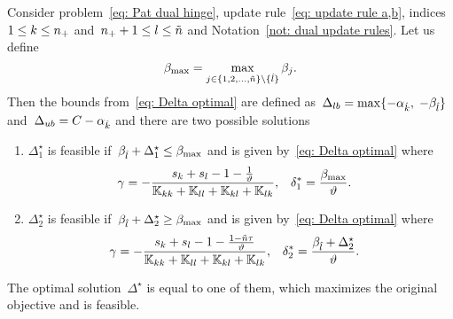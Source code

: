 \begin{lemma}\label{thm: patmat family hinge update a,b}
  Consider problem~\eqref{eq: Pat dual hinge}, update rule~\eqref{eq: update rule a,b}, indices~$1 \leq k \leq n_{+}$ and~$n_{+} + 1 \leq l \leq \tilde{n}$  and Notation~\ref{not: dual update rules}. Let us define
  \begin{equation*}
    \beta_{\max} = \max_{j \in \{1, 2, \ldots, \tilde{n} \} \setminus \{\hat{l}\}} \beta_j.
  \end{equation*}
  Then the bounds from~\eqref{eq: Delta optimal} are defined as~$\Delta_{lb} = \max\{- \alpha_{\hat{k}},\; -\beta_{\hat{l}} \}$ and~$\Delta_{ub} = C - \alpha_{\hat{k}}$ and there are two possible solutions
  \begin{enumerate}
    \item $\Delta^{\star}_1$ is feasible if~$\beta_{\hat{l}} + \Delta^{\star}_1 \leq \beta_{\max}$ and is given by~\eqref{eq: Delta optimal} where
    \begin{align*}
      \gamma
        & = -\frac{s_k + s_l - 1 - \frac{1}{\vartheta}}{\mathbb{K}_{kk} + \mathbb{K}_{ll} + \mathbb{K}_{kl} + \mathbb{K}_{lk}}, &
      \delta^{*}_1
        & = \frac{\beta_{\max}}{\vartheta}.
    \end{align*}
    \item $\Delta^{\star}_2$ is feasible if~$\beta_{\hat{l}} + \Delta^{\star}_2 \geq \beta_{\max}$ and is given by~\eqref{eq: Delta optimal} where
    \begin{align*}
      \gamma
        & = -\frac{s_k + s_l - 1 - \frac{1 - \tilde{n} \tau}{\vartheta}}{\mathbb{K}_{kk} + \mathbb{K}_{ll} + \mathbb{K}_{kl} + \mathbb{K}_{lk}}, &
      \delta^{*}_2
        & = \frac{\beta_{\hat{l}} + \Delta^{\star}_2}{\vartheta}.
    \end{align*}
  \end{enumerate}
  The optimal solution~$\Delta^{\star}$ is equal to one of them, which maximizes the original objective and is feasible.
\end{lemma}

